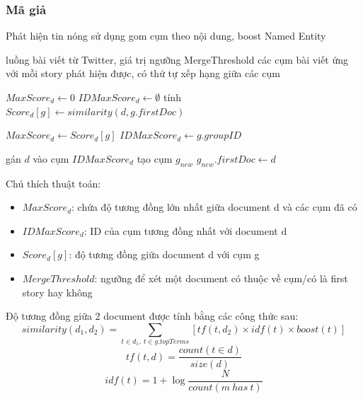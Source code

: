 	\subsubsection{Mã giả}
	\begin{algorithm}[H]
		\caption{Phát hiện tin nóng sử dụng gom cụm theo nội dung, boost Named Entity}
		\begin{algorithmic}[1]
			\REQUIRE luồng bài viết từ Twitter, giá trị ngưỡng MergeThreshold
			\ENSURE các cụm bài viết ứng với mỗi story phát hiện được, có thứ tự xếp hạng giữa các cụm

				\State $MaxScore_d \leftarrow 0$
				\State $IDMaxScore_d \leftarrow \emptyset$
					\State tính $Score_d[g] \leftarrow similarity(d, g.firstDoc)$
					
						\State $MaxScore_d \leftarrow Score_d[g]$
						\State $IDMaxScore_d \leftarrow g.groupID$
					\ENDIF
				\ENDFOR
				
					\State gán $d$ vào cụm $IDMaxScore_d$
				\ELSE
					\State tạo cụm $g_{new}$
					\State $g_{new}.firstDoc \leftarrow d$
				\ENDIF
			\ENDFOR
		\end{algorithmic}
	\end{algorithm}
	Chú thích thuật toán:
	\begin{itemize}
		\item $MaxScore_d$: chứa độ tương đồng lớn nhất giữa document d và các cụm đã có
		\item $IDMaxScore_d$: ID của cụm tương đồng nhất với document d
		\item $Score_d[g]$: độ tương đồng giữa document d với cụm g 
		\item $MergeThreshold$: ngưỡng để xét một document có thuộc về cụm/có là first story hay không
	\end{itemize}
	Độ tương đồng giữa 2 document được tính bằng các công thức sau:
	\begin{equation}
			similarity(d_1, d_2) = \sum_{t \in d_1,\ t \in g.topTerms}[tf(t, d_2) \times idf(t) \times boost(t)]
	\end{equation}
	\begin{equation}
		tf(t, d) = \frac{count(t \in d)}{size(d)}
	\end{equation}
	\begin{equation}
		idf(t) = 1 + \log\frac{N}{count(m\ has\ t)}
	\end{equation}
